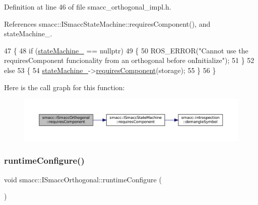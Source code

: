 Definition at line 46 of file smacc\+\_\+orthogonal\+\_\+impl.\+h.



References smacc\+::\+I\+Smacc\+State\+Machine\+::requires\+Component(), and state\+Machine\+\_\+.


\begin{DoxyCode}
47 \{
48     \textcolor{keywordflow}{if} (\hyperlink{classsmacc_1_1ISmaccOrthogonal_a418b2e094a65013444ec1fca7e94f28d}{stateMachine\_} == \textcolor{keyword}{nullptr})
49     \{
50         ROS\_ERROR(\textcolor{stringliteral}{"Cannot use the requiresComponent funcionality from an orthogonal before onInitialize"});
51     \}
52     \textcolor{keywordflow}{else}
53     \{
54         \hyperlink{classsmacc_1_1ISmaccOrthogonal_a418b2e094a65013444ec1fca7e94f28d}{stateMachine\_}->\hyperlink{classsmacc_1_1ISmaccStateMachine_aa6b25e28f3bce24c4b356dc865a9eb7b}{requiresComponent}(storage);
55     \}
56 \}
\end{DoxyCode}
Here is the call graph for this function\+:
\nopagebreak
\begin{figure}[H]
\begin{center}
\leavevmode
\includegraphics[width=350pt]{classsmacc_1_1ISmaccOrthogonal_a3f66cf4680e3026a6789769c8ea1aa83_cgraph}
\end{center}
\end{figure}
\mbox{\label{classsmacc_1_1ISmaccOrthogonal_a47ae4af0f05ea31cc98b4e1d792d1126}} 
\subsubsection{\texorpdfstring{runtime\+Configure()}{runtimeConfigure()}}
{\footnotesize\ttfamily void smacc\+::\+I\+Smacc\+Orthogonal\+::runtime\+Configure (\begin{DoxyParamCaption}{ }\end{DoxyParamCaption})}




